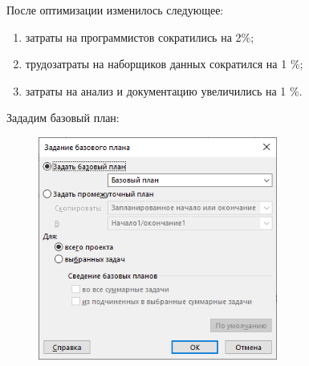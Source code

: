 После оптимизации изменилось следующее:

\begin{enumerate}
	\item затраты на программистов сократились на 2\%;
	\item трудозатраты на наборщиков данных сократился на 1 \%;
	\item затраты на анализ и документацию увеличились на 1 \%.
\end{enumerate}

Зададим базовый план:

\begin{figure}[H]
	\begin{center}
		\includegraphics[width=0.7\textwidth]{imgs/task_3_3.png}
	\end{center}
\end{figure}